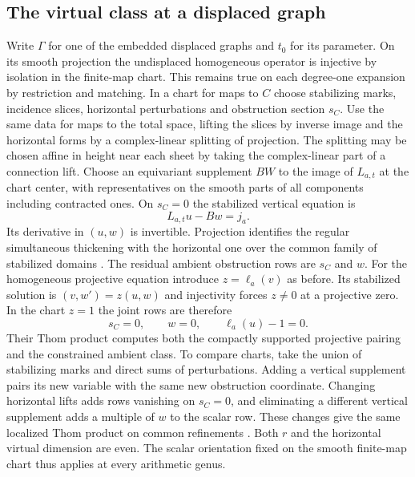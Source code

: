 \subsection{The virtual class at a displaced graph}
Write $\Gamma$ for one of the embedded displaced graphs and $t_0$ for
its parameter. On its smooth projection the undisplaced homogeneous
operator is injective by isolation in the finite-map chart. This
remains true on each degree-one expansion by restriction and matching.
In a chart for maps to $C$ choose stabilizing marks, incidence slices,
horizontal perturbations and obstruction section $s_C$. Use the same
data for maps to the total space, lifting the slices by inverse
image and the horizontal forms by a complex-linear splitting of
projection. The splitting may be chosen affine in height near each
sheet by taking the complex-linear part of a connection lift.
Choose an equivariant supplement $BW$ to the image of $L_{a,t}$ at
the chart center, with representatives on the smooth parts of all
components including contracted ones. On $s_C=0$ the stabilized
vertical equation is
\[
                         L_{a,t}u-Bw=j_a .
\]
Its derivative in $(u,w)$ is invertible. Projection identifies the
regular simultaneous thickening with the horizontal one over the common
family of stabilized domains \cite[Theorem~3.5 and Lemma~5.10]{swam}.
The residual ambient obstruction rows are $s_C$ and $w$. For the
homogeneous projective equation introduce $z=\ell_a(v)$ as before.
Its stabilized solution is $(v,w')=z(u,w)$ and injectivity forces
$z\ne0$ at a projective zero. In the chart $z=1$ the joint rows are
therefore
\[
                       s_C=0,\qquad w=0,\qquad\ell_a(u)-1=0 .
\]
Their Thom product computes both the compactly supported projective
pairing and the constrained ambient class. To compare charts, take
the union of stabilizing marks and direct sums of perturbations.
Adding a vertical supplement pairs its new variable with the same
new obstruction coordinate. Changing horizontal lifts adds rows
vanishing on $s_C=0$, and eliminating a different vertical
supplement adds a multiple of $w$ to the scalar row. These changes
give the same localized Thom product on common refinements
\cite[\S9.2]{pardonatlas}. Both $r$ and the horizontal virtual
dimension are even. The scalar orientation fixed on the smooth
finite-map chart thus applies at every arithmetic genus.

